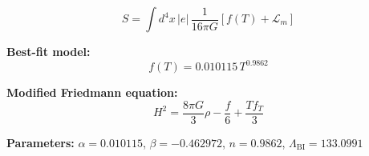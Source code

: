 
\begin{equation}
  S = \int d^4x \, |e| \, \frac{1}{16\pi G} \left[ f(T) + \mathcal{L}_m \right]
\end{equation}

\textbf{Best-fit model:}
\begin{equation}
  f(T) = 0.010115 \, T^{0.9862}
\end{equation}

\textbf{Modified Friedmann equation:}
\begin{equation}
  H^2 = \frac{8\pi G}{3} \rho - \frac{f}{6} + \frac{T f_T}{3}
\end{equation}

\textbf{Parameters:}
$\alpha = 0.010115$, \quad
$\beta = -0.462972$, \quad
$n = 0.9862$, \quad
$\Lambda_{\text{BI}} = 133.0991$